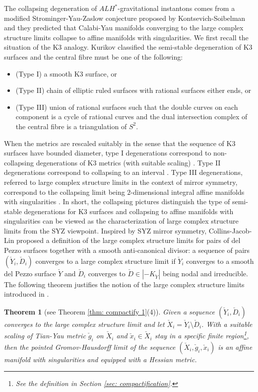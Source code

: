 \documentclass[11pt]{amsart}
\theoremstyle{plain}
\newtheorem{thm}{Theorem}[section]
\theoremstyle{definition}
\numberwithin{equation}{section}
\begin{document}
The collapsing degeneration of $ALH^*$-gravitational instantons comes from a modified Strominger-Yau-Zaslow conjecture proposed by Kontsevich-Soibelman \cite{KS} and they predicted that Calabi-Yau manifolds converging to the large complex structure limits collapse to affine manifolds with singularities. We first recall the situation of the K3 analogy. Kurikov classified the semi-stable degeneration of K3 surfaces \cite{K} and the central fibre must be one of the following:
\begin{itemize}
	\item (Type I) a smooth K3 surface, or 
	\item (Type II) chain of elliptic ruled surfaces with rational surfaces either ends, or
	\item (Type III) union of rational surfaces such that the double curves on each component is a cycle of rational curves and the dual intersection complex of the central fibre is a triangulation of $S^2$. 
\end{itemize}
When the metrics are rescaled suitably in the sense that the sequence of K3 surfaces have bounded diameter, type I degenerations correspond to non-collapsing degenerations of K3 metrics (with suitable scaling) \cite{A}. Type II degenerations correspond to collapsing to an interval \cite{HSVZ, HSZ}. Type III degenerations, referred to large complex structure limits in the context of mirror symmetry, correspond to the collapsing limit being $2$-dimensional integral affine manifolds with singularities \cite{GW, OO}. In short, the collapsing pictures distinguish the type of semi-stable degenerations for K3 surfaces and collapsing to affine manifolds with singularities can be viewed as the characterization of large complex structure limits from the SYZ viewpoint. Inspired by SYZ mirror symmetry, Collins-Jacob-Lin proposed a definition of the large complex structure limits for pairs of del Pezzo surfaces together with a smooth anti-canonical divisor: a sequence of pairs $(\check{Y}_i,\check{D}_i)$ converges to a large complex structure limit if $\check{Y}_i$ converges to a smooth del Pezzo surface $\check{Y}$ and $\check{D}_i$ converges to $\check{D}\in |-K_{\check{Y}}|$ being nodal and irreducible. The following theorem justifies the notion of the large complex structure limits introduced in \cite{CJL2}. 	
\begin{thm}[see Theorem \ref{thm: compactify 1}(4)] \label{main thm}
	Given a sequence $(\check{Y}_i,\check{D}_i)$ converges to the large complex structure limit and let $\check{X}_i=\check{Y}_i\setminus \check{D}_i$. With a suitable scaling of Tian-Yau metric $\check{g}_i$ on $\check{X}_i$ and $\check{x}_i\in \check{X}_i$ stay in a specific finite region\footnote{See the definition in Section \ref{sec: compactification}.}, then the pointed Gromov-Hausdorff limit of the sequence  $(\check{X}_i, \check{g}_i,\check{x}_i)$ is an affine manifold with singularities and equipped with a Hessian metric. 
\end{thm}
\end{document}
